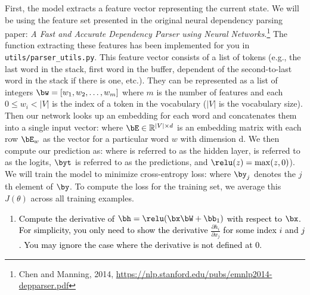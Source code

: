 \begin{parts}
    First, the model extracts a feature vector representing the current state. We will be using the feature set presented in the original neural dependency parsing paper: {\it A Fast and Accurate Dependency Parser using Neural Networks}.\footnote{Chen and Manning, 2014, \url{https://nlp.stanford.edu/pubs/emnlp2014-depparser.pdf}} The function extracting these features has been implemented for you in \texttt{utils/parser\_utils.py}. This feature vector consists of a list of tokens (e.g., the last word in the stack, first word in the buffer, dependent of the second-to-last word in the stack if there is one, etc.). They can be represented as a list of integers $\bw = [w_1, w_2, \dots, w_m]$ where $m$ is the number of features and each $0 \leq w_i < |V|$ is the index of a token in the vocabulary ($|V|$ is the vocabulary size). Then our network looks up an embedding for each word and concatenates them into a single input vector:
    where $\bE \in \mathbb{R}^{|V| \times d}$ is an embedding matrix with each row $\bE_w$ as the vector for a particular word $w$ with dimension d. We then compute our prediction as:
    where \bh \space is referred to as the hidden layer, \bl \space is referred to as the logits, $\byt$ \space is referred to as the predictions, and $\relu(z) = \max(z, 0)$). We will train the model to minimize cross-entropy loss:
     where $\by_j$ denotes the $j$th element of $\by$.
    To compute the loss for the training set, we average this $J(\theta)$ across all training examples.
    
    \begin{enumerate}[label=\roman*.]
    
        \item \textcolor{black}{Compute the derivative of $\bh = \relu(\bx \bW + \bb_1)$ with respect to $\bx$. For simplicity, you only need to show the derivative $\frac{\partial h_i}{\partial x_j}$ for some index $i$ and $j$. You may ignore the case where the derivative is not defined at 0.}
        

\end{enumerate}
\end{parts}
